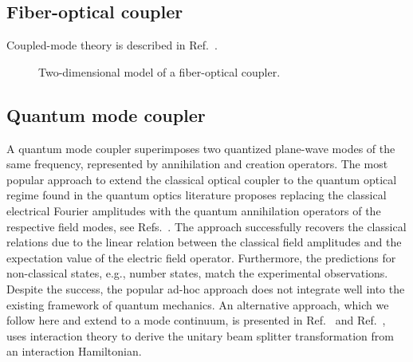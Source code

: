 \FloatBarrier
\subsection{Fiber-optical coupler}

Coupled-mode theory is described in Ref.~\cite[p.~359]{Luks2009}.
\begin{figure}[htb]
	\centering
	
	\caption{Two-dimensional model of a fiber-optical coupler.}\label{fig:fiber_coupler}
\end{figure}

\FloatBarrier
\subsection{Quantum mode coupler}



A quantum mode coupler superimposes two quantized plane-wave modes of the same frequency, represented by annihilation and creation operators.
The most popular approach to extend the classical optical coupler to the quantum optical regime found in the quantum optics literature proposes replacing the classical electrical Fourier amplitudes with the quantum annihilation operators of the respective field modes, see Refs.~\cite{Leonhardt2010,Fox2006,Gerry2005}.
The approach successfully recovers the classical relations due to the linear relation between the classical field amplitudes and the expectation value of the electric field operator.
Furthermore, the predictions for non-classical states, e.g., number states, match the experimental observations.
Despite the success, the popular ad-hoc approach does not integrate well into the existing framework of quantum mechanics.
An alternative approach, which we follow here and extend to a mode continuum, is presented in Ref.~\cite[p.~131]{Haroche2006} and Ref.~\cite[p.~17]{QuesadaMejia2015}, uses interaction theory to derive the unitary beam splitter transformation from an interaction Hamiltonian.

